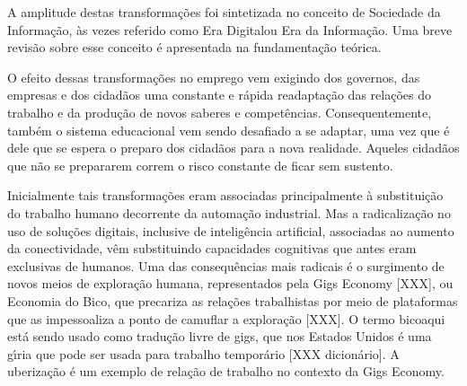 \documentclass[
12pt,		%
openright,	%
twoside,  %
a4paper,			%
chapter=TITLE,		%
english,			%
french,				%
spanish,			%
brazil				%
]{USPSC-classe/USPSC}
\begin{document}
A amplitude destas transforma\c{c}\~oes foi sintetizada no conceito de \textquotedbl Sociedade da Informa\c{c}\~ao\textquotedbl , \`as vezes referido como \textquotedbl Era Digital\textquotedbl  ou \textquotedbl Era da Informa\c{c}\~ao\textquotedbl . Uma breve revis\~ao sobre esse conceito \'e apresentada na fundamenta\c{c}\~ao te\'orica.














O efeito dessas transforma\c{c}\~oes no emprego vem exigindo dos governos, das empresas e dos cidad\~aos uma constante e r\'apida readapta\c{c}\~ao  das rela\c{c}\~oes do trabalho e da produ\c{c}\~ao de novos saberes e compet\^encias. Consequentemente, tamb\'em o sistema educacional vem sendo desafiado a se adaptar, uma vez que \'e dele que se espera o preparo dos cidad\~aos para a nova realidade. Aqueles cidad\~aos que n\~ao se prepararem correm o risco constante de ficar sem sustento.














Inicialmente tais transforma\c{c}\~oes eram associadas principalmente \`a substitui\c{c}\~ao do trabalho humano decorrente da automa\c{c}\~ao industrial. Mas a radicaliza\c{c}\~ao no uso de solu\c{c}\~oes digitais, inclusive de intelig\^encia artificial, associadas ao aumento da conectividade, v\^em substituindo capacidades \textquotedbl cognitivas que antes eram exclusivas de humanos\textquotedbl [4 XXX]. Uma das consequ\^encias mais radicais \'e o surgimento de novos meios de explora\c{c}\~ao humana, representados pela \textquotedbl Gigs Economy [XXX], ou \textquotedbl Economia do Bico\textquotedbl , que precariza as rela\c{c}\~oes trabalhistas por meio de plataformas que as impessoaliza a ponto de camuflar a explora\c{c}\~ao [XXX]. O termo \textquotedbl bico\textquotedbl  aqui est\'a sendo usado como tradu\c{c}\~ao livre de \textquotedbl gigs\textquotedbl , que nos Estados Unidos \'e uma g\'{\i}ria que pode ser usada para trabalho tempor\'ario [XXX dicion\'ario]. A uberiza\c{c}\~ao \'e um exemplo de rela\c{c}\~ao de trabalho no contexto da Gigs Economy.
\end{document}
